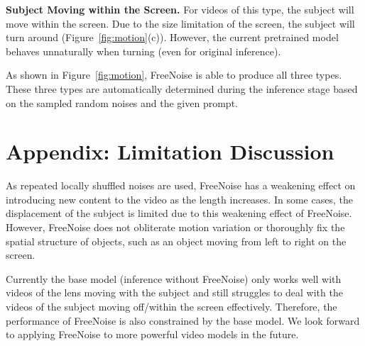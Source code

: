 \noindent\textbf{Subject Moving within the Screen.}
For videos of this type, the subject will move within the screen. Due to the size limitation of the screen, the subject will turn around (Figure~\ref{fig:motion}(c)). However, the current pretrained model behaves unnaturally when turning (even for original inference).

As shown in Figure~\ref{fig:motion}, FreeNoise is able to produce all three types. These three types are automatically determined during the inference stage based on the sampled random noises and the given prompt.
%

\section{Appendix: Limitation Discussion}

As repeated locally shuffled noises are used, FreeNoise has a weakening effect on introducing new content to the video as the length increases. In some cases, the displacement of the subject is limited due to this weakening effect of FreeNoise. However, FreeNoise does not obliterate motion variation or thoroughly fix the spatial structure of objects, such as an object moving from left to right on the screen.

Currently the base model (inference without FreeNoise) only works well with videos of the lens moving with the subject and still struggles to deal with the videos of the subject moving off/within the screen effectively. Therefore, the performance of FreeNoise is also constrained by the base model. We look forward to applying FreeNoise to more powerful video models in the future.
